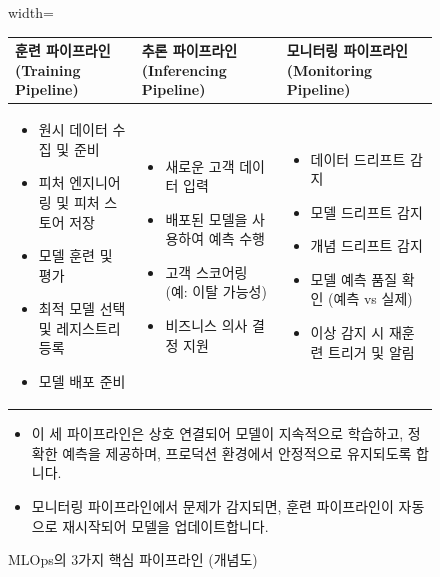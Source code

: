 \documentclass[11pt,a4paper]{article}
\begin{document}
\begin{figure}[h!]
    \centering
    \caption{MLOps의 3가지 핵심 파이프라인 (개념도)}
    \label{fig:mlops_three_pipelines}
    \begin{adjustbox}{width=\textwidth}
    \begin{tabular}{p{} | p{} | p{}}
    \toprule
    \textbf{훈련 파이프라인 (Training Pipeline)} & \textbf{추론 파이프라인 (Inferencing Pipeline)} & \textbf{모니터링 파이프라인 (Monitoring Pipeline)} \\
    \midrule
    \begin{itemize}
        \item 원시 데이터 수집 및 준비
        \item 피처 엔지니어링 및 피처 스토어 저장
        \item 모델 훈련 및 평가
        \item 최적 모델 선택 및 레지스트리 등록
        \item 모델 배포 준비
    \end{itemize} &
    \begin{itemize}
        \item 새로운 고객 데이터 입력
        \item 배포된 모델을 사용하여 예측 수행
        \item 고객 스코어링 (예: 이탈 가능성)
        \item 비즈니스 의사 결정 지원
    \end{itemize} &
    \begin{itemize}
        \item 데이터 드리프트 감지
        \item 모델 드리프트 감지
        \item 개념 드리프트 감지
        \item 모델 예측 품질 확인 (예측 vs 실제)
        \item 이상 감지 시 재훈련 트리거 및 알림
    \end{itemize} \\
    \bottomrule
    \end{tabular}
    \end{adjustbox}
    \vspace{1em}
    \begin{itemize}
        \item 이 세 파이프라인은 상호 연결되어 모델이 지속적으로 학습하고, 정확한 예측을 제공하며, 프로덕션 환경에서 안정적으로 유지되도록 합니다.
        \item 모니터링 파이프라인에서 문제가 감지되면, 훈련 파이프라인이 자동으로 재시작되어 모델을 업데이트합니다.
    \end{itemize}
\end{figure}
\end{document}
